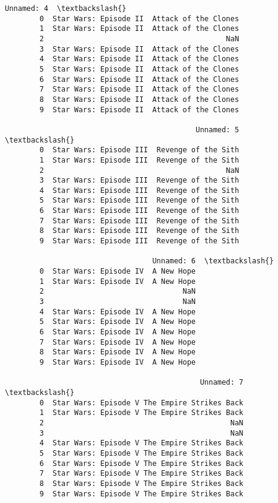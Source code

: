 \documentclass[11pt]{article}
\begin{document}
\begin{Verbatim}[commandchars=\\\{\}]
                                            Unnamed: 4  \textbackslash{}
        0  Star Wars: Episode II  Attack of the Clones   
        1  Star Wars: Episode II  Attack of the Clones   
        2                                          NaN   
        3  Star Wars: Episode II  Attack of the Clones   
        4  Star Wars: Episode II  Attack of the Clones   
        5  Star Wars: Episode II  Attack of the Clones   
        6  Star Wars: Episode II  Attack of the Clones   
        7  Star Wars: Episode II  Attack of the Clones   
        8  Star Wars: Episode II  Attack of the Clones   
        9  Star Wars: Episode II  Attack of the Clones   
        
                                            Unnamed: 5  \textbackslash{}
        0  Star Wars: Episode III  Revenge of the Sith   
        1  Star Wars: Episode III  Revenge of the Sith   
        2                                          NaN   
        3  Star Wars: Episode III  Revenge of the Sith   
        4  Star Wars: Episode III  Revenge of the Sith   
        5  Star Wars: Episode III  Revenge of the Sith   
        6  Star Wars: Episode III  Revenge of the Sith   
        7  Star Wars: Episode III  Revenge of the Sith   
        8  Star Wars: Episode III  Revenge of the Sith   
        9  Star Wars: Episode III  Revenge of the Sith   
        
                                  Unnamed: 6  \textbackslash{}
        0  Star Wars: Episode IV  A New Hope   
        1  Star Wars: Episode IV  A New Hope   
        2                                NaN   
        3                                NaN   
        4  Star Wars: Episode IV  A New Hope   
        5  Star Wars: Episode IV  A New Hope   
        6  Star Wars: Episode IV  A New Hope   
        7  Star Wars: Episode IV  A New Hope   
        8  Star Wars: Episode IV  A New Hope   
        9  Star Wars: Episode IV  A New Hope   
        
                                             Unnamed: 7  \textbackslash{}
        0  Star Wars: Episode V The Empire Strikes Back   
        1  Star Wars: Episode V The Empire Strikes Back   
        2                                           NaN   
        3                                           NaN   
        4  Star Wars: Episode V The Empire Strikes Back   
        5  Star Wars: Episode V The Empire Strikes Back   
        6  Star Wars: Episode V The Empire Strikes Back   
        7  Star Wars: Episode V The Empire Strikes Back   
        8  Star Wars: Episode V The Empire Strikes Back   
        9  Star Wars: Episode V The Empire Strikes Back   
        

\end{Verbatim}
\end{document}
